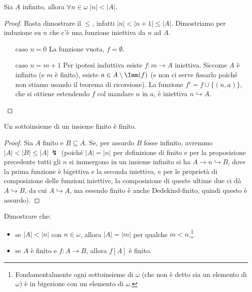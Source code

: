 \documentclass[11pt]{scrartcl}
\begin{document}
\begin{proposition}
	Sia $A$ infinito, allora $\forall n\in \omega \; |n| < |A|$.
\end{proposition}

\begin{proof}
	Basta dimostrare il $\leq$, infatti $|n| < |n+1| \leq |A|$. Dimostriamo per induzione su $n$ che c'è una funzione iniettiva da $n$ ad $A$.
	\begin{itemize}
		\item[$\boxed{\text{caso $n = 0$}}$] La funzione vuota, $f = \emptyset$.
		\item[$\boxed{\text{caso $n = m+1$}}$] Per ipotesi induttiva esiste $f : m \rightarrow A$ iniettiva. Siccome $A$ è infinito (e $m$ è finito), esiste $a \in A \setminus \Imm(f)$ (e non ci serve fissarlo poiché non stiamo usando il teorema di ricorsione).
		La funzione $f' = f \cup \{(n,a)\}$, che si ottiene estendendo $f$ col 
		mandare $n$ in $a$, è iniettiva $n \hookrightarrow A$.
	\end{itemize}
\end{proof}

\begin{corollary}[Ovvietà]
	Un sottoinsieme di un insieme finito è finito.
\end{corollary}

\begin{proof}
	Sia $A$ finito e $B \subseteq A$. Se, per assurdo $B$ fosse infinito, avremmo $|A| < |B| \leq |A| \, \lightning$ (poiché $|A| = |n|$ per definizione di finito e per la proposizione precedente tutti gli $n$ si immergono in un insieme infinito si ha $A \rightarrow n \hookrightarrow B$, dove la prima funzione è bigettiva e la seconda iniettiva, e per le proprietà di composizione delle 
	funzioni iniettive, la composizione di queste ultime due ci dà $A \hookrightarrow B$, da cui $A \hookrightarrow A$, ma essendo finito è anche Dedekind-finito, quindi questo è assurdo).
\end{proof}

\begin{exercise}
	Dimostrare che:
	\begin{itemize}
		\item se $|A| < |n|$ con $n \in \omega$, allora $|A| = |m|$ per qualche $m < n$.\footnote{Fondamentalmente ogni sottoinsieme di $\omega$ (che non è detto sia un elemento di $\omega$) è in bigezione con un elemento di $\omega$.}
		\item se $A$ è finito e $f : A \rightarrow B$, allora $f[A]$ è finito.
	\end{itemize}	
\end{exercise}
\end{document}
